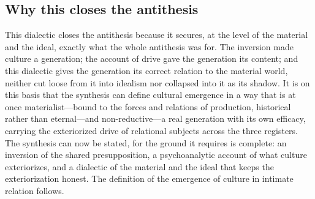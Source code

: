 \subsection*{Why this closes the antithesis}

This dialectic closes the antithesis because it secures, at the level of the material and the ideal, exactly what the whole antithesis was for. The inversion made culture a generation; the account of drive gave the generation its content; and this dialectic gives the generation its correct relation to the material world, neither cut loose from it into idealism nor collapsed into it as its shadow. It is on this basis that the synthesis can define cultural emergence in a way that is at once materialist---bound to the forces and relations of production, historical rather than eternal---and non-reductive---a real generation with its own efficacy, carrying the exteriorized drive of relational subjects across the three registers. The synthesis can now be stated, for the ground it requires is complete: an inversion of the shared presupposition, a psychoanalytic account of what culture exteriorizes, and a dialectic of the material and the ideal that keeps the exteriorization honest. The definition of the emergence of culture in intimate relation follows.
